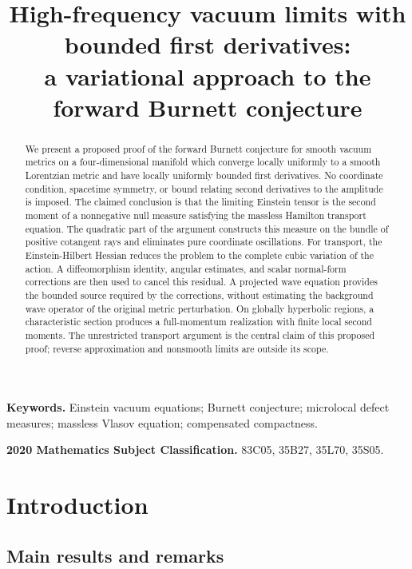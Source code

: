 \documentclass[11pt,a4paper]{article}
\title{High-frequency vacuum limits with bounded first derivatives:\\
a variational approach to the forward Burnett conjecture}
\author{}
\date{}
\numberwithin{equation}{section}
\theoremstyle{definition}
\begin{document}
\maketitle
\vspace{-2.5em}
\begin{abstract}
We present a proposed proof of the forward Burnett conjecture for smooth
vacuum metrics on a four-dimensional manifold which converge locally
uniformly to a smooth Lorentzian metric and have locally uniformly bounded
first derivatives. No coordinate condition, spacetime symmetry, or bound
relating second derivatives to the amplitude is imposed. The claimed
conclusion is that the limiting Einstein tensor is the second moment of a
nonnegative null measure satisfying the massless Hamilton transport equation.
The quadratic part of the argument constructs this measure on the bundle
of positive cotangent rays and eliminates pure coordinate oscillations.
For transport, the Einstein-Hilbert Hessian reduces the problem to the
complete cubic variation of the action. A diffeomorphism identity, angular
estimates, and scalar normal-form corrections are then used to cancel this
residual. A projected wave equation provides the bounded source required
by the corrections, without estimating the background wave operator of
the original metric perturbation. On globally hyperbolic regions, a
characteristic section produces a full-momentum realization with finite
local second moments. The unrestricted transport argument is the central
claim of this proposed proof; reverse approximation and nonsmooth limits
are outside its scope.
\end{abstract}
\noindent\textbf{Keywords.} Einstein vacuum equations; Burnett conjecture;
microlocal defect measures; massless Vlasov equation; compensated compactness.

\smallskip
\noindent\textbf{2020 Mathematics Subject Classification.} 83C05, 35B27, 35L70, 35S05.

\tableofcontents
\clearpage

\section{Introduction}\label{sec:introduction}

\subsection{Main results and remarks}
\end{document}
